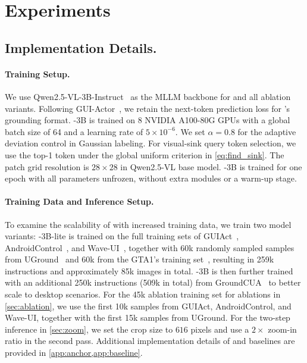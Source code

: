 \section{Experiments}\label{sec:exp}
\subsection{Implementation Details.}
\paragraph{Training Setup.}
We use Qwen2.5-VL-3B-Instruct~\citep{bai2025qwen2} as the MLLM backbone for \method{} and all ablation variants. Following GUI-Actor~\citep{wu2025gui}, we retain the next-token prediction loss for \method{}'s grounding format. \method{}-3B is trained on 8 NVIDIA A100-80G GPUs with a global batch size of 64 and a learning rate of $5\times 10^{-6}$. We set $\alpha=0.8$ for the adaptive deviation control in Gaussian labeling. For visual-sink query token selection, we use the top-1 token under the global uniform criterion in \cref{eq:find_sink}. The patch grid resolution is $28\times 28$ in Qwen2.5-VL base model. \method{}-3B is trained for one epoch with all parameters unfrozen, without extra modules or a warm-up stage.

\paragraph{Training Data and Inference Setup.}
To examine the scalability of \method{} with increased training data, we train two model variants: \method{}-3B-lite is trained on the full training sets of GUIAct~\citep{chen2024guicourse}, AndroidControl~\citep{li2024effects}, and Wave-UI~\citep{waveui}, together with 60k randomly sampled samples from UGround~\citep{gou2024navigating} and 60k from the GTA1's training set~\citep{yang2025gta1guitesttimescaling}, resulting in 259k instructions and approximately 85k images in total. \method{}-3B is then further trained with an additional 250k instructions (509k in total) from GroundCUA~\citep{feizi2025grounding} to better scale to desktop scenarios. For the 45k ablation training set for ablations in \cref{sec:ablation}, we use the first 10k samples from GUIAct, AndroidControl, and Wave-UI, together with the first 15k samples from UGround. For the two-step inference in \cref{sec:zoom}, we set the crop size to $616$ pixels and use a $2\times$ zoom-in ratio in the second pass. Additional implementation details of \method{} and baselines are provided in \cref{app:anchor,app:baseline}.

